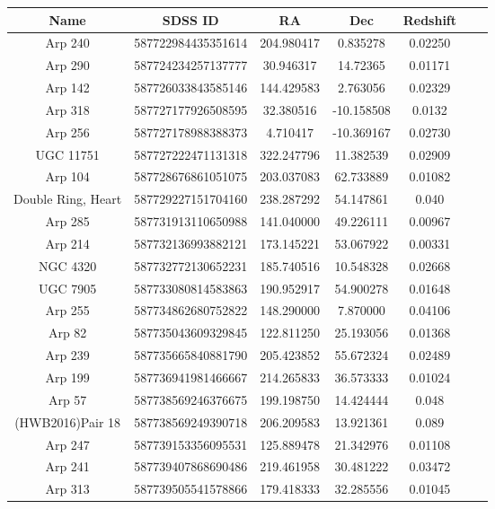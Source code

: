 \begin{table}
    \centering
    \begin{tabular}{|c|c|c|c|c|c|c|}
    \hline
         Name & SDSS ID & RA & Dec & Redshift \\
         \hline
         Arp 240 & 587722984435351614 & 204.980417 & 0.835278 & 0.02250 \\
         Arp 290 & 587724234257137777 & 30.946317 & 14.72365 & 0.01171 \\
         Arp 142 & 587726033843585146 & 144.429583 & 2.763056 & 0.02329 \\
         Arp 318 & 587727177926508595 & 32.380516 & -10.158508 & 0.0132 \\
         Arp 256 & 587727178988388373 & 4.710417 & -10.369167 & 0.02730 \\
         UGC 11751 & 587727222471131318 & 322.247796 & 11.382539 & 0.02909 \\
         Arp 104 & 587728676861051075 & 203.037083 & 62.733889 & 0.01082 \\
         Double Ring, Heart & 587729227151704160 & 238.287292 & 54.147861 & 0.040 \\
         Arp 285 & 587731913110650988 & 141.040000 & 49.226111 & 0.00967 \\
         Arp 214 & 587732136993882121 & 173.145221 & 53.067922 & 0.00331 \\
         NGC 4320 & 587732772130652231 & 185.740516 & 10.548328 & 0.02668 \\
         UGC 7905 & 587733080814583863 & 190.952917 & 54.900278 & 0.01648 \\
         Arp 255 & 587734862680752822 & 148.290000 & 7.870000 & 0.04106 \\
         Arp 82 & 587735043609329845 & 122.811250 & 25.193056 & 0.01368 \\
         Arp 239 & 587735665840881790 & 205.423852 & 55.672324 & 0.02489 \\
         Arp 199 & 587736941981466667 & 214.265833 & 36.573333 & 0.01024 \\
         Arp 57 & 587738569246376675 & 199.198750 & 14.424444 & 0.048 \\
         (HWB2016)Pair 18 & 587738569249390718 & 206.209583 & 13.921361 & 0.089 \\
         Arp 247 & 587739153356095531 & 125.889478 & 21.342976 & 0.01108 \\
         Arp 241 & 587739407868690486 & 219.461958 & 30.481222 & 0.03472 \\
         Arp 313 & 587739505541578866 & 179.418333 & 32.285556 & 0.01045 \\

\end{tabular}
\end{table}
